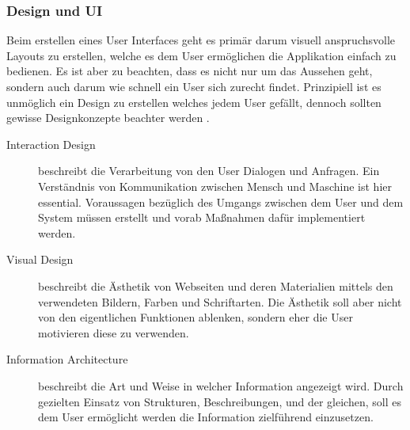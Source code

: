 \subsubsection{Design und UI}
\label{subsec:WAppDesign}

Beim erstellen eines User Interfaces geht es primär darum visuell anspruchsvolle Layouts zu erstellen, welche es dem User ermöglichen die Applikation einfach zu bedienen. Es ist aber zu beachten, dass es nicht nur um das Aussehen geht, sondern auch darum wie schnell ein User sich zurecht findet. Prinzipiell ist es unmöglich ein Design zu erstellen welches jedem User gefällt, dennoch sollten gewisse Designkonzepte beachter werden \cite{MELD.CH3-web-app.ui1}\cite{MELD.CH3-web-app.ui2}.

\begin{description}
\item[Interaction Design]
beschreibt die Verarbeitung von den User Dialogen und Anfragen. Ein Verständnis von Kommunikation zwischen Mensch und Maschine ist hier essential. Voraussagen bezüglich des Umgangs zwischen dem User und dem System müssen erstellt und vorab Maßnahmen dafür implementiert werden.

\item[Visual Design]
beschreibt die Ästhetik von Webseiten und deren Materialien mittels den verwendeten Bildern, Farben und Schriftarten. Die Ästhetik soll aber nicht von den eigentlichen Funktionen ablenken, sondern eher die User motivieren diese zu verwenden.

\item[Information Architecture]
beschreibt die Art und Weise in welcher Information angezeigt wird. Durch gezielten Einsatz von Strukturen, Beschreibungen, und der gleichen, soll es dem User ermöglicht werden die Information zielführend einzusetzen.
\end{description}

